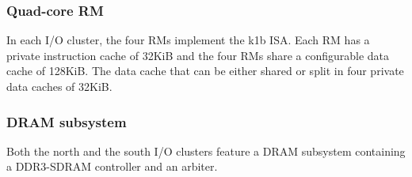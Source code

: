 \documentclass[main.tex]{subfiles}
\begin{document}
\subsubsection{Quad-core RM}
In each I/O cluster, the four RMs implement the k1b ISA. Each RM has a private instruction cache of 32KiB and the four RMs share a configurable data cache of 128KiB. The data cache that can be either shared or split in four private data caches of 32KiB.

\subsubsection{DRAM subsystem}
\label{sssec_systemModel_MPPADRAMarbiter}
Both the north and the south I/O clusters feature a DRAM subsystem containing a DDR3-SDRAM controller and an arbiter.
\end{document}
